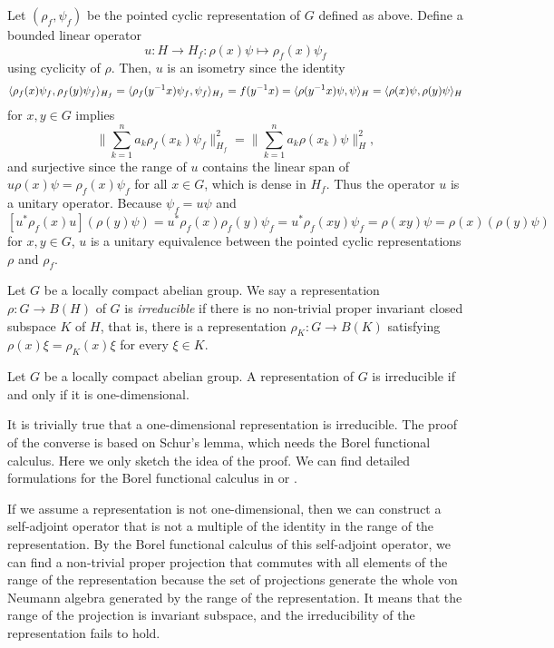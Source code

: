 \documentclass[a4paper]{article}
\begin{document}
\begin{pf}
Let $(\rho_f,\psi_f)$ be the pointed cyclic representation of $G$ defined as above.
Define a bounded linear operator
\[u:H\to H_f:\rho(x)\psi\mapsto\rho_f(x)\psi_f\]
using cyclicity of $\rho$.
Then, $u$ is an isometry since the identity
\[\langle\rho_f(x)\psi_f,\rho_f(y)\psi_f\rangle_{H_f}=\langle\rho_f(y^{-1}x)\psi_f,\psi_f\rangle_{H_f}=f(y^{-1}x)=\langle\rho(y^{-1}x)\psi,\psi\rangle_H=\langle\rho(x)\psi,\rho(y)\psi\rangle_H\]
for $x,y\in G$ implies
\[\|\sum_{k=1}^na_k\rho_f(x_k)\psi_f\|_{H_f}^2=\|\sum_{k=1}^na_k\rho(x_k)\psi\|_H^2,\]
and surjective since the range of $u$ contains the linear span of $u\rho(x)\psi=\rho_f(x)\psi_f$ for all $x\in G$, which is dense in $H_f$.
Thus the operator $u$ is a unitary operator.
Because $\psi_f=u\psi$ and
\[[u^*\rho_f(x)u](\rho(y)\psi)=u^*\rho_f(x)\rho_f(y)\psi_f=u^*\rho_f(xy)\psi_f=\rho(xy)\psi=\rho(x)(\rho(y)\psi)\]
for $x,y\in G$, $u$ is a unitary equivalence between the pointed cyclic representations $\rho$ and $\rho_f$.
\end{pf}



\begin{defn}
Let $G$ be a locally compact abelian group.
We say a representation $\rho:G\to B(H)$ of $G$ is \emph{irreducible} if there is no non-trivial proper invariant closed subspace $K$ of $H$, that is, there is a representation $\rho_K:G\to B(K)$ satisfying $\rho(x)\xi=\rho_K(x)\xi$ for every $\xi\in K$.
\end{defn}
\begin{lem}
Let $G$ be a locally compact abelian group.
A representation of $G$ is irreducible if and only if it is one-dimensional.
\end{lem}
\begin{pf}
It is trivially true that a one-dimensional representation is irreducible.
The proof of the converse is based on Schur's lemma, which needs the Borel functional calculus.
Here we only sketch the idea of the proof.
We can find detailed formulations for the Borel functional calculus in \cite{murphy2014c} or \cite{conway2019course}.

If we assume a representation is not one-dimensional, then we can construct a self-adjoint operator that is not a multiple of the identity in the range of the representation.
By the Borel functional calculus of this self-adjoint operator, we can find a non-trivial proper projection that commutes with all elements of the range of the representation because the set of projections generate the whole von Neumann algebra generated by the range of the representation.
It means that the range of the projection is invariant subspace, and the irreducibility of the representation fails to hold.
\end{pf}
\end{document}
